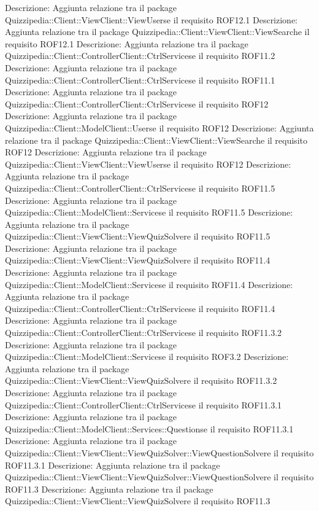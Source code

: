 Descrizione: Aggiunta relazione tra il package Quizzipedia::Client::ViewClient::ViewUserse il requisito ROF12.1 
Descrizione: Aggiunta relazione tra il package Quizzipedia::Client::ViewClient::ViewSearche il requisito ROF12.1 
Descrizione: Aggiunta relazione tra il package Quizzipedia::Client::ControllerClient::CtrlServicese il requisito ROF11.2 
Descrizione: Aggiunta relazione tra il package Quizzipedia::Client::ControllerClient::CtrlServicese il requisito ROF11.1 
Descrizione: Aggiunta relazione tra il package Quizzipedia::Client::ControllerClient::CtrlServicese il requisito ROF12 
Descrizione: Aggiunta relazione tra il package Quizzipedia::Client::ModelClient::Userse il requisito ROF12 
Descrizione: Aggiunta relazione tra il package Quizzipedia::Client::ViewClient::ViewSearche il requisito ROF12 
Descrizione: Aggiunta relazione tra il package Quizzipedia::Client::ViewClient::ViewUserse il requisito ROF12 
Descrizione: Aggiunta relazione tra il package Quizzipedia::Client::ControllerClient::CtrlServicese il requisito ROF11.5 
Descrizione: Aggiunta relazione tra il package Quizzipedia::Client::ModelClient::Servicese il requisito ROF11.5 
Descrizione: Aggiunta relazione tra il package Quizzipedia::Client::ViewClient::ViewQuizSolvere il requisito ROF11.5 
Descrizione: Aggiunta relazione tra il package Quizzipedia::Client::ViewClient::ViewQuizSolvere il requisito ROF11.4 
Descrizione: Aggiunta relazione tra il package Quizzipedia::Client::ModelClient::Servicese il requisito ROF11.4 
Descrizione: Aggiunta relazione tra il package Quizzipedia::Client::ControllerClient::CtrlServicese il requisito ROF11.4 
Descrizione: Aggiunta relazione tra il package Quizzipedia::Client::ControllerClient::CtrlServicese il requisito ROF11.3.2 
Descrizione: Aggiunta relazione tra il package Quizzipedia::Client::ModelClient::Servicese il requisito ROF3.2 
Descrizione: Aggiunta relazione tra il package Quizzipedia::Client::ViewClient::ViewQuizSolvere il requisito ROF11.3.2 
Descrizione: Aggiunta relazione tra il package Quizzipedia::Client::ControllerClient::CtrlServicese il requisito ROF11.3.1 
Descrizione: Aggiunta relazione tra il package Quizzipedia::Client::ModelClient::Services::Questionse il requisito ROF11.3.1 
Descrizione: Aggiunta relazione tra il package Quizzipedia::Client::ViewClient::ViewQuizSolver::ViewQuestionSolvere il requisito ROF11.3.1 
Descrizione: Aggiunta relazione tra il package Quizzipedia::Client::ViewClient::ViewQuizSolver::ViewQuestionSolvere il requisito ROF11.3 
Descrizione: Aggiunta relazione tra il package Quizzipedia::Client::ViewClient::ViewQuizSolvere il requisito ROF11.3 
